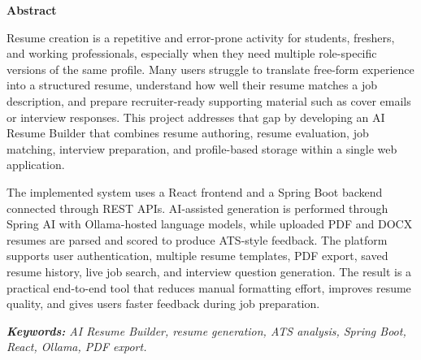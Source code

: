 \begin{center}
\thispagestyle{plain}
\vspace{2cm}
\LARGE{\textbf{Abstract}}\\[1.0cm]
\end{center}
Resume creation is a repetitive and error-prone activity for students, freshers, and working professionals, especially when they need multiple role-specific versions of the same profile. Many users struggle to translate free-form experience into a structured resume, understand how well their resume matches a job description, and prepare recruiter-ready supporting material such as cover emails or interview responses. This project addresses that gap by developing an AI Resume Builder that combines resume authoring, resume evaluation, job matching, interview preparation, and profile-based storage within a single web application.

The implemented system uses a React frontend and a Spring Boot backend connected through REST APIs. AI-assisted generation is performed through Spring AI with Ollama-hosted language models, while uploaded PDF and DOCX resumes are parsed and scored to produce ATS-style feedback. The platform supports user authentication, multiple resume templates, PDF export, saved resume history, live job search, and interview question generation. The result is a practical end-to-end tool that reduces manual formatting effort, improves resume quality, and gives users faster feedback during job preparation.

\newline \newline
\textit{{\textbf{Keywords: }} AI Resume Builder, resume generation, ATS analysis, Spring Boot, React, Ollama, PDF export.}
